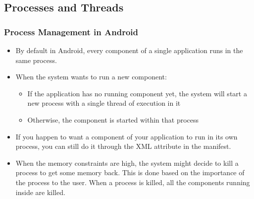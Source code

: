 \subsection{Processes and Threads}

\begin{frame}
  \frametitle{Process Management in Android}
  \begin{itemize}
  \item By default in Android, every component of a single
    application runs in the same process.
  \item When the system wants to run a new component:
    \begin{itemize}
    \item If the application has no running component yet, the
      system will start a new process with a single thread of
      execution in it
    \item Otherwise, the component is started within that process
    \end{itemize}
  \item If you happen to want a component of your application to run
    in its own process, you can still do it through the
     XML attribute in the manifest.
  \item When the memory constraints are high, the system might decide
    to kill a process to get some memory back. This is done based on
    the importance of the process to the user. When a process is
    killed, all the components running inside are killed.
  \end{itemize}
\end{frame}

